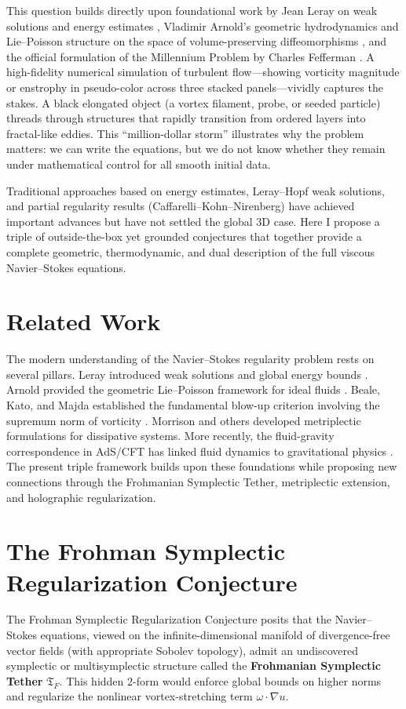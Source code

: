 \documentclass[11pt,a4paper]{article}
\begin{document}
This question builds directly upon foundational work by Jean Leray on weak solutions and energy estimates \cite{Leray1934}, Vladimir Arnold’s geometric hydrodynamics and Lie–Poisson structure on the space of volume-preserving diffeomorphisms \cite{Arnold1966}, and the official formulation of the Millennium Problem by Charles Fefferman \cite{FeffermanClay}. A high-fidelity numerical simulation of turbulent flow—showing vorticity magnitude or enstrophy in pseudo-color across three stacked panels—vividly captures the stakes. A black elongated object (a vortex filament, probe, or seeded particle) threads through structures that rapidly transition from ordered layers into fractal-like eddies. This “million-dollar storm” illustrates why the problem matters: we can write the equations, but we do not know whether they remain under mathematical control for all smooth initial data.

Traditional approaches based on energy estimates, Leray–Hopf weak solutions, and partial regularity results (Caffarelli–Kohn–Nirenberg) have achieved important advances but have not settled the global 3D case. Here I propose a triple of outside-the-box yet grounded conjectures that together provide a complete geometric, thermodynamic, and dual description of the full viscous Navier–Stokes equations.

\section{Related Work}
The modern understanding of the Navier–Stokes regularity problem rests on several pillars. Leray introduced weak solutions and global energy bounds \cite{Leray1934}. Arnold provided the geometric Lie–Poisson framework for ideal fluids \cite{Arnold1966}. Beale, Kato, and Majda established the fundamental blow-up criterion involving the supremum norm of vorticity \cite{BealeKatoMajda1984}. Morrison and others developed metriplectic formulations for dissipative systems. More recently, the fluid-gravity correspondence in AdS/CFT has linked fluid dynamics to gravitational physics \cite{MaldacenaFluidGravity}. The present triple framework builds upon these foundations while proposing new connections through the Frohmanian Symplectic Tether, metriplectic extension, and holographic regularization.

\section{The Frohman Symplectic Regularization Conjecture}
The Frohman Symplectic Regularization Conjecture posits that the Navier--Stokes equations, viewed on the infinite-dimensional manifold of divergence-free vector fields (with appropriate Sobolev topology), admit an undiscovered symplectic or multisymplectic structure called the \textbf{Frohmanian Symplectic Tether} \(\mathfrak{T}_F\). This hidden 2-form would enforce global bounds on higher norms and regularize the nonlinear vortex-stretching term \(\omega \cdot \nabla u\).
\end{document}

